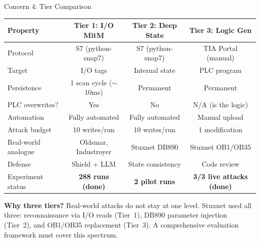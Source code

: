\documentclass[aspectratio=169,10pt]{beamer}
\begin{document}
\begin{frame}{Concern 4: Tier Comparison}

\begin{table}
\centering
\small
\begin{tabular}{@{}lccc@{}}
\toprule
\textbf{Property} & \textcolor{tier1}{\textbf{Tier 1: I/O MitM}} & \textcolor{tier2}{\textbf{Tier 2: Deep State}} & \textcolor{tier3}{\textbf{Tier 3: Logic Gen}} \\
\midrule
Protocol & S7 (python-snap7) & S7 (python-snap7) & TIA Portal (manual) \\
Target & I/O tags & Internal state & PLC program \\
Persistence & 1 scan cycle ($\sim$10ms) & Permanent & Permanent \\
PLC overwrites? & Yes & No & N/A (is the logic) \\
Automation & Fully automated & Fully automated & Manual upload \\
Attack budget & 10 writes/run & 10 writes/run & 1 modification \\
Real-world analogue & Oldsmar, Industroyer & Stuxnet DB890 & Stuxnet OB1/OB35 \\
Defense & Shield + LLM & State consistency & Code review \\
Experiment status & \textbf{288 runs (done)} & \textbf{2 pilot runs} & \textbf{3/3 live attacks (done)} \\
\bottomrule
\end{tabular}
\end{table}

\vspace{0.3em}
\textbf{Why three tiers?}
Real-world attacks do not stay at one level. Stuxnet used all three: reconnaissance via I/O reads (Tier~1), DB890 parameter injection (Tier~2), and OB1/OB35 replacement (Tier~3). A comprehensive evaluation framework must cover this spectrum.
\end{frame}
\end{document}
